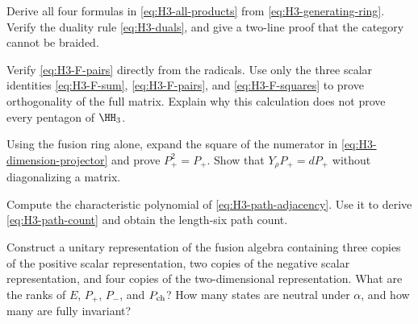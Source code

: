 \begin{exercise}\label{ex:H3-fusion}
Derive all four formulas in \eqref{eq:H3-all-products} from
\eqref{eq:H3-generating-ring}.  Verify the duality rule
\eqref{eq:H3-duals}, and give a two-line proof that the category
cannot be braided.

\par\smallskip{}\par
\end{exercise}

\begin{exercise}\label{ex:H3-F}
Verify \eqref{eq:H3-F-pairs} directly from the radicals.  Use only
the three scalar identities \eqref{eq:H3-F-sum},
\eqref{eq:H3-F-pairs}, and \eqref{eq:H3-F-squares} to prove
orthogonality of the full matrix.  Explain why this calculation
does not prove every pentagon of $\HH_3$.

\par\smallskip{}\par
\end{exercise}

\begin{exercise}\label{ex:H3-P}
Using the fusion ring alone, expand the square of the numerator in
\eqref{eq:H3-dimension-projector} and prove $P_+^2=P_+$.
Show that $Y_\rho P_+=dP_+$ without diagonalizing a matrix.

\par\smallskip{}\par
\end{exercise}

\begin{exercise}\label{ex:H3-characteristic}
Compute the characteristic polynomial of
\eqref{eq:H3-path-adjacency}.  Use it to derive
\eqref{eq:H3-path-count} and obtain the length-six path count.

\par\smallskip{}\par
\end{exercise}

\begin{exercise}\label{ex:H3-neutral}
Construct a unitary representation of the fusion algebra containing
three copies of the positive scalar representation, two copies of
the negative scalar representation, and four copies of the
two-dimensional representation.  What are the ranks of $E$, $P_+$,
$P_-$, and $P_{\rm ch}$?  How many states are neutral under
$\alpha$, and how many are fully invariant?

\par\smallskip{}\par
\end{exercise}

